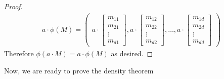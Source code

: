\begin{proof}
\begin{align*}
    a \cdot \phi(M) =  \begin{pmatrix}
   a \cdot \begin{bmatrix} 
         m_{11} \\
         m_{21} \\
         \vdots \\
         m_{d1} 
    \end{bmatrix}, a \cdot \begin{bmatrix} m_{12} \\ m_{22} \\ \vdots \\ m_{d2}\end{bmatrix}, \dots ,  a \cdot \begin{bmatrix}
        m_{1d} \\ m_{2d} \\ \vdots \\ m_{dd} 
    \end{bmatrix}
\end{pmatrix}
\end{align*}
Therefore $\phi(a \cdot M) = a \cdot \phi(M)$ as desired.
\end{proof}
Now, we are ready to prove the density theorem

